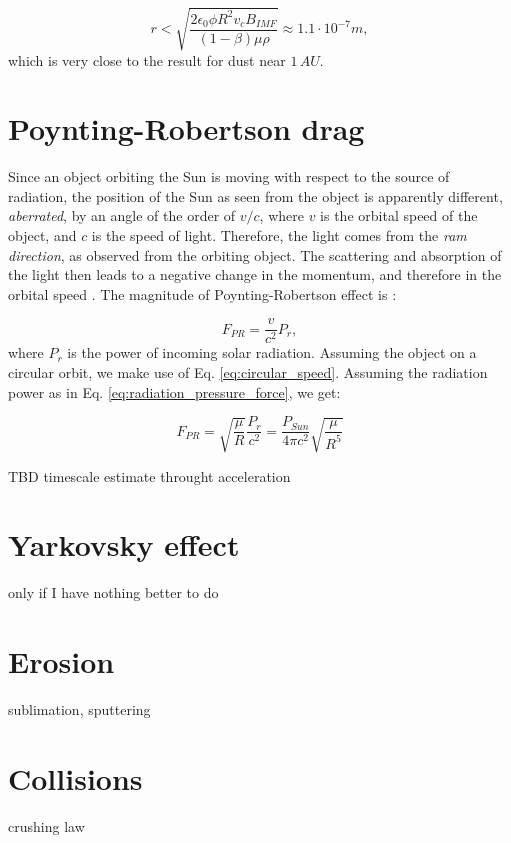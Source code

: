 \begin{equation}
    r < \sqrt{\frac{2 \epsilon_0 \phi R^2 v_{c} B_{IMF}}{(1-\beta) \mu \rho}} \approx 
    1.1 \cdot 10^{-7} \si{m},
\end{equation}
which is very close to the result for dust near $1 \, \si{AU}$.

\section{Poynting-Robertson drag}

Since an object orbiting the Sun is moving with respect to the source of radiation, the position of the Sun as seen from the object is apparently different, \textit{aberrated}, by an angle of the order of $v/c$, where $v$ is the orbital speed of the object, and $c$ is the speed of light. Therefore, the light comes from the \textit{ram direction}, as observed from the orbiting object. The scattering and absorption of the light then leads to a negative change in the momentum, and therefore in the orbital speed \citep{poynting1903radiation}. The magnitude of Poynting-Robertson effect is \citep{robertson1937dynamical}:

\begin{equation}
    F_{PR} = \frac{v}{c^2} P_{r},
\end{equation}
where $P_r$ is the power of incoming solar radiation. Assuming the object on a circular orbit, we make use of Eq. \ref{eq:circular_speed}. Assuming the radiation power as in Eq. \ref{eq:radiation_pressure_force}, we get:

\begin{equation}
    F_{PR} = \sqrt{\frac{\mu}{R}} \frac{P_{r}}{c^2} = \frac{P_{Sun}}{4 \pi c^2} \sqrt{\frac{\mu}{R^5}} 
\end{equation}

TBD timescale estimate throught acceleration

\section{Yarkovsky effect}

only if I have nothing better to do

\section{Erosion}

sublimation, sputtering

\section{Collisions}

crushing law